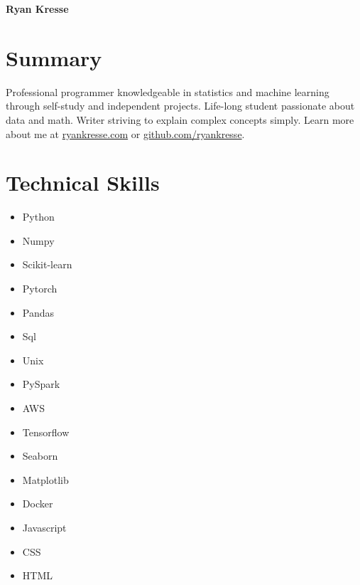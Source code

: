 \documentclass[11pt]{article}
\begin{document}
	
	\noindent \textbf{{\Huge Ryan Kresse}}
	\smallskip
	
	
	\section{Summary}
		Professional programmer knowledgeable in statistics and machine learning through self-study and independent projects.
		Life-long student passionate about data and math. Writer striving to explain complex concepts simply. Learn more about me at \href{http://ryankresse.com/blog}{ryankresse.com} or \href{https://github.com/ryankresse}{github.com/ryankresse}.  
	\begin{comment}
	\section{Contact and Links}
		\begin{itemize}[noitemsep]
			\item rkresse53@gmail.com
			\item ryankresse.com
			\item github.com/ryankresse
		\end{itemize}
	\end{comment}
	
	\section{Technical Skills}
		\begin{multicols}{4}
			\begin{itemize}
				\item Python 				
				\item Numpy 
				\item Scikit-learn 
				\item Pytorch
				\columnbreak
				
				\item Pandas 
				\item Sql 
				\item Unix 
				\item PySpark
				\columnbreak
				
				\item AWS
				\item Tensorflow 
				\item Seaborn
				\item Matplotlib			
								 
							
				
				\columnbreak 
				\item Docker
				\item Javascript 
				\item CSS
				\item HTML 
				
				 				
				\columnbreak 
				
			\end{itemize}
		\end{multicols}
	
\end{document}
